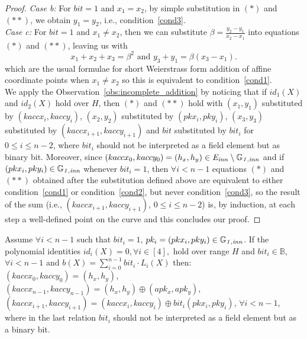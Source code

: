 \begin{proof}
\noindent \textit{Case b:} For $\mathit{bit}=1$ and $x_1=x_2$, by simple substitution in $(\ast)$ and $(\ast \ast)$, 
we obtain $y_1 = y_2$, i.e., condition~\ref{cond3}.  \\

\noindent \textit{Case c:} For $\mathit{bit}=1$ and $x_1 \neq x_2$, then we can substitute
$\beta=\frac{y_2-y_1}{x_2-x_1}$ into equations $(\ast)$ and $(\ast \ast)$, leaving us with
$$x_1+x_2+x_3=\beta^2 \textrm{ and } y_3+y_1=\beta(x_3-x_1).$$
which are the usual formulae for short Weierstrass form addition of affine coordinate points when $x_1 \neq x_2$ 
so this is equivalent to condition~\ref{cond1}. \\

\noindent We apply the Observation~\ref{obs:incomplete_addition} by noticing that if $id_1(X)$ and $id_2(X)$ hold over $H$, 
then $(\ast)$ and $(\ast \ast)$ hold with $(x_1, y_1)$ substituted by $(kaccx_i,kaccy_i)$, $(x_2, y_2)$ 
substituted by $(pkx_i, pky_i)$, $(x_3, y_3)$ substituted by $(kaccx_{i+1},kaccy_{i+1})$ and $\mathit{bit}$ 
substituted by $\mathit{bit}_i$ for $0 \leq i \leq n-2$, where $\mathit{bit_i}$ should not be interpreted as a field element but as binary 
bit. Moreover, since $(kaccx_{0}, kaccy_{0}) = (h_x, h_y) \in \mathit{E}_{\mathit{inn}} \setminus \mathbb{G}_{\mathit{1,inn}}$ 
and if $(pkx_i, pky_i) \in \mathbb{G}_{\mathit{1,inn}}$ whenever $\mathit{bit}_i = 1$, then $\forall i < n-1$ 
equations $(\ast)$ and $(\ast \ast)$ obtained after the substitution defined above are equivalent to either 
condition~\ref{cond1} or condition~\ref{cond2}, but never condition~\ref{cond3}, so the result of the sum (i.e., $(kaccx_{i+1}, kaccy_{i+1})$, $0\leq i \leq n-2$) is, 
by induction, at each step a well-defined point on the curve and this concludes our proof.
\end{proof}

\begin{corollary} Assume $\forall i < n-1$ 
such that $\mathit{bit}_i = 1$, $pk_i = (pkx_i, pky_i) \in \mathbb{G}_{\mathit{1,inn}}$. 
If the polynomial identities $id_i(X) = 0, \forall i \in [4],$ hold over range $H$ and 
$\mathit{bit_i} \in \mathbb{B}$, $\forall i < n-1$ and $b(X) = \sum_{i=0}^{n-1} \mathit{bit_i} \cdot L_i(X)$
then:  \\
$(kaccx_{0}, kaccy_{0}) = (h_x, h_y)$, \\
$(kaccx_{n-1}, kaccy_{n-1}) = (h_x, h_y) \oplus (apk_x, apk_y)$, \\
$(kaccx_{i+1}, kaccy_{i+1}) =  (kaccx_{i}, kaccy_{i}) \oplus \mathit{bit_i}(pkx_{i}, pky_{i})$, $\forall i < n-1$, where in the last relation 
$\mathit{bit_i}$ should not be interpreted as a field element but as a binary bit.
\label{corollary:keys_affine_comm}
\end{corollary}

